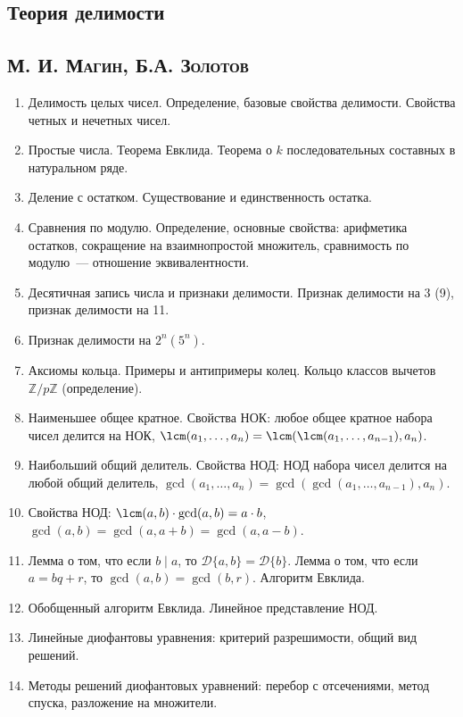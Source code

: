 \documentclass[11pt]{article}
\begin{document}
\begin{center}
    \section*{Теория делимости}
    \subsection*{\textsc{М. И. Магин, Б.А. Золотов}}
\end{center}
\begin{enumerate}
    \item Делимость целых чисел. Определение, базовые свойства делимости. Свойства четных и нечетных чисел.
    \item Простые числа. Теорема Евклида. Теорема о $k$ последовательных составных в натуральном ряде.
    \item Деление с остатком. Существование и единственность остатка.
    \item Сравнения по модулю. Определение, основные свойства: арифметика остатков, сокращение на взаимнопростой множитель, сравнимость по модулю~--- отношение эквивалентности.
    \item Десятичная запись числа и признаки делимости. Признак делимости на 3 (9), признак делимости на 11.
    \item Признак делимости на $2^n (5^n)$.
    \item Аксиомы кольца. Примеры и антипримеры колец. Кольцо классов вычетов $\mathbb{Z}/p\mathbb{Z}$ (определение).
    \item Наименьшее общее кратное. Свойства НОК: любое общее кратное набора чисел делится на НОК, $\lcm(a_1, \ldots, a_n) = \lcm(\lcm(a_1, \ldots, a_{n - 1}), a_n)$.
    \item Наибольший общий делитель. Свойства НОД: НОД набора чисел делится на любой общий делитель, $\gcd(a_1, \ldots, a_n) = \gcd(\gcd(a_1, \ldots, a_{n - 1}), a_n)$.
    \item Свойства НОД: $\lcm(a, b) \cdot \gcd(a, b) = a \cdot b$, $\gcd(a, b) = \gcd(a, a + b) = \gcd(a, a - b)$.
    \item Лемма о том, что если $b \mid a$, то $\mathcal{D}\{ a, b\} = \mathcal{D}\{ b \}$. Лемма о том, что если $a = bq + r$, то $\gcd(a, b) = \gcd(b, r)$. Алгоритм Евклида.
    \item Обобщенный алгоритм Евклида. Линейное представление НОД.
    \item Линейные диофантовы уравнения: критерий разрешимости, общий вид решений.
    \item Методы решений диофантовых уравнений: перебор с отсечениями, метод спуска, разложение на множители.

\end{enumerate}
\end{document}
